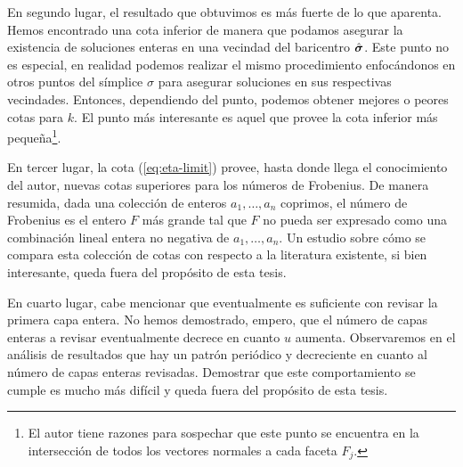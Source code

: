 En segundo lugar, el resultado que obtuvimos es más fuerte de lo que aparenta. Hemos encontrado una
cota inferior de manera que podamos asegurar la existencia de soluciones enteras en una vecindad del
baricentro $\hat{\boldsymbol{ \sigma }}$. Este punto no es especial, en realidad podemos realizar el mismo
procedimiento enfocándonos en otros puntos del símplice $\sigma$ para asegurar soluciones en sus
respectivas vecindades. Entonces, dependiendo del punto, podemos obtener mejores o peores cotas para
$k$. El punto más interesante es aquel que provee la cota inferior más pequeña\footnote{
	El autor tiene razones para sospechar que este punto se encuentra en la intersección de todos
	los vectores normales a cada faceta $F_j$.
}.

En tercer lugar, la cota (\ref{eq:eta-limit}) provee, hasta donde llega el conocimiento del autor,
nuevas cotas superiores para los números de Frobenius. De manera resumida, dada una colección de
enteros $a_1, \ldots, a_n$ coprimos, el número de Frobenius es el entero $F$ más grande tal que $F$
no pueda ser expresado como una combinación lineal entera no negativa de $a_1, \ldots, a_n$. Un
estudio sobre cómo se compara esta colección de cotas con respecto a la literatura existente, si
bien interesante, queda fuera del propósito de esta tesis.

En cuarto lugar, cabe mencionar que eventualmente es suficiente con revisar la primera capa entera.
No hemos demostrado, empero, que el número de capas enteras a revisar eventualmente decrece en
cuanto $u$ aumenta. Observaremos en el análisis de resultados que hay un patrón periódico y
decreciente en cuanto al número de capas enteras revisadas. Demostrar que este comportamiento se
cumple es mucho más difícil y queda fuera del propósito de esta tesis.

